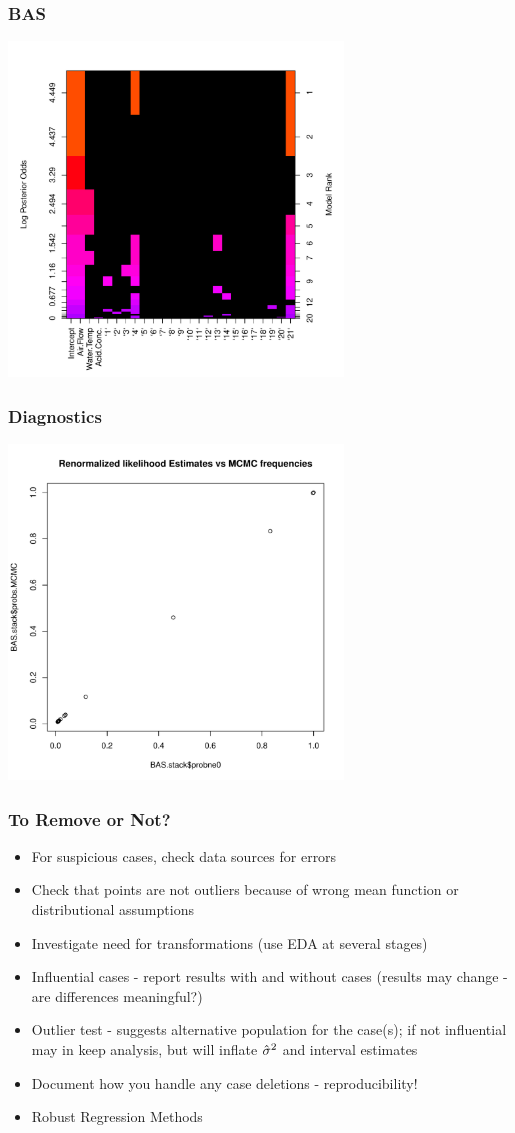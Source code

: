 \documentclass[]{beamer}
\begin{document}
\begin{frame}  \frametitle{BAS}

    \centerline{\includegraphics[height=3.5in]{image-stackloss}}
  \end{frame}
\begin{frame}  \frametitle{Diagnostics}

    \centerline{\includegraphics[height=3.5in]{BAS-diagnostic}}
  \end{frame}
  \begin{frame} \frametitle{To Remove or Not?}
    \begin{itemize}
    \item  For suspicious cases, check data sources for errors \pause
    \item  Check that points are not outliers because of wrong mean
      function or distributional assumptions  \pause
  \item Investigate need for transformations  (use EDA at several stages)
   \item Influential cases - report results with and without cases
     (results may change - are differences meaningful?)  \pause
   \item Outlier test - suggests alternative population for the case(s); if not
     influential may in keep analysis, but will inflate ${\hat{\sigma}}^2$ and
     interval estimates   \pause
   \item Document how you handle any case deletions - reproducibility! \pause
   \item Robust Regression Methods  \pause
    \end{itemize}
  \end{frame}
\end{document}
